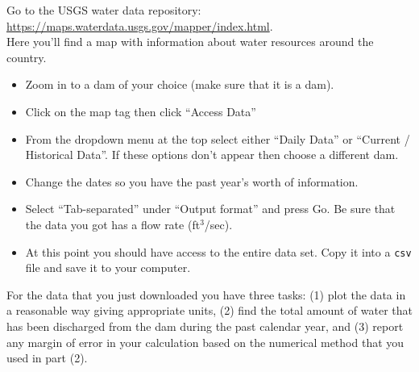 \begin{problem}
    Go to the USGS water data repository: \\
    \href{https://maps.waterdata.usgs.gov/mapper/index.html}{https://maps.waterdata.usgs.gov/mapper/index.html}.\\
    Here you'll find a map with information about water resources around the country.
    \begin{itemize}
        \item Zoom in to a dam of your choice (make sure that it is a dam).
        \item Click on the map tag then click ``Access Data''
        \item From the dropdown menu at the top select either ``Daily Data'' or ``Current
            / Historical Data''.  If these options don't appear then choose a different
            dam.
        \item Change the dates so you have the past year's worth of information.
        \item Select ``Tab-separated'' under ``Output format'' and press Go.  Be sure that
            the data you got has a flow rate (ft$^3$/sec).
        \item At this point you should have access to the entire data set.  Copy it into a
            \texttt{csv} file and save it to your computer.
    \end{itemize}
    For the data that you just downloaded you have three tasks: (1) plot the data in a
    reasonable way giving appropriate units, (2) find the total amount of water that
    has been discharged from the dam during the past calendar year, and (3) report any
    margin of error in your calculation based on the numerical method that you used in
    part (2).
\end{problem}
